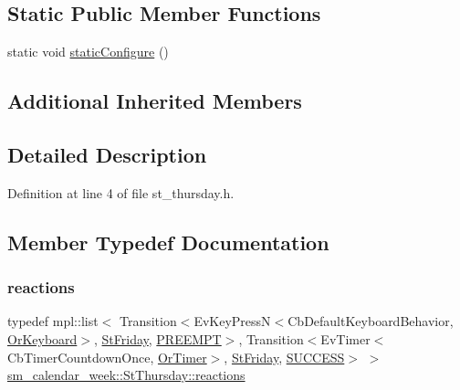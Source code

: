 \subsection*{Static Public Member Functions}
\begin{DoxyCompactItemize}
\item 
static void \hyperlink{structsm__calendar__week_1_1StThursday_ace087bef31c63fa8e67bd835a46b6a6f}{static\+Configure} ()
\end{DoxyCompactItemize}
\subsection*{Additional Inherited Members}


\subsection{Detailed Description}


Definition at line 4 of file st\+\_\+thursday.\+h.



\subsection{Member Typedef Documentation}
\mbox{\label{structsm__calendar__week_1_1StThursday_a01b39d7646f8e0d4dba1fd189914951f}} 
\subsubsection{\texorpdfstring{reactions}{reactions}}
{\footnotesize\ttfamily typedef mpl\+::list$<$ Transition$<$Ev\+Key\+PressN$<$Cb\+Default\+Keyboard\+Behavior, \hyperlink{classsm__calendar__week_1_1OrKeyboard}{Or\+Keyboard}$>$, \hyperlink{structsm__calendar__week_1_1StFriday}{St\+Friday}, \hyperlink{classPREEMPT}{P\+R\+E\+E\+M\+PT}$>$, Transition$<$Ev\+Timer$<$Cb\+Timer\+Countdown\+Once, \hyperlink{classsm__calendar__week_1_1OrTimer}{Or\+Timer}$>$, \hyperlink{structsm__calendar__week_1_1StFriday}{St\+Friday}, \hyperlink{classSUCCESS}{S\+U\+C\+C\+E\+SS}$>$ $>$ \hyperlink{structsm__calendar__week_1_1StThursday_a01b39d7646f8e0d4dba1fd189914951f}{sm\+\_\+calendar\+\_\+week\+::\+St\+Thursday\+::reactions}}



